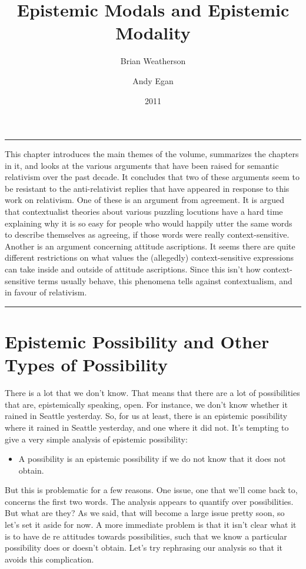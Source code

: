 \documentclass[
  10pt,
  letterpaper,
  DIV=11,
  numbers=noendperiod,
  twoside]{scrartcl}
\title{Epistemic Modals and Epistemic Modality}
\author{Brian Weatherson \and Andy Egan}
\date{2011}
\providecommand{\tightlist}{%
  \setlength{\itemsep}{0pt}\setlength{\parskip}{0pt}}\usepackage{longtable,booktabs,array}
\renewenvironment{abstract}
 {\vspace{-1.25cm}
 \quotation\small\noindent\rule{\linewidth}{.5pt}\par\smallskip
 \noindent }
 {\par\noindent\rule{\linewidth}{.5pt}\endquotation}
\begin{document}
\maketitle
\begin{abstract}
This chapter introduces the main themes of the volume, summarizes the
chapters in it, and looks at the various arguments that have been raised
for semantic relativism over the past decade. It concludes that two of
these arguments seem to be resistant to the anti-relativist replies that
have appeared in response to this work on relativism. One of these is an
argument from agreement. It is argued that contextualist theories about
various puzzling locutions have a hard time explaining why it is so easy
for people who would happily utter the same words to describe themselves
as agreeing, if those words were really context-sensitive. Another is an
argument concerning attitude ascriptions. It seems there are quite
different restrictions on what values the (allegedly) context-sensitive
expressions can take inside and outside of attitude ascriptions. Since
this isn't how context-sensitive terms usually behave, this phenomena
tells against contextualism, and in favour of relativism.
\end{abstract}


\section{Epistemic Possibility and Other Types of
Possibility}\label{epistemic-possibility-and-other-types-of-possibility}

There is a lot that we don't know. That means that there are a lot of
possibilities that are, epistemically speaking, open. For instance, we
don't know whether it rained in Seattle yesterday. So, for us at least,
there is an epistemic possibility where it rained in Seattle yesterday,
and one where it did not. It's tempting to give a very simple analysis
of epistemic possibility:

\begin{itemize}
\tightlist
\item
  A possibility is an epistemic possibility if we do not know that it
  does not obtain.
\end{itemize}

But this is problematic for a few reasons. One issue, one that we'll
come back to, concerns the first two words. The analysis appears to
quantify over possibilities. But what are they? As we said, that will
become a large issue pretty soon, so let's set it aside for now. A more
immediate problem is that it isn't clear what it is to have de re
attitudes towards possibilities, such that we know a particular
possibility does or doesn't obtain. Let's try rephrasing our analysis so
that it avoids this complication.
\end{document}
